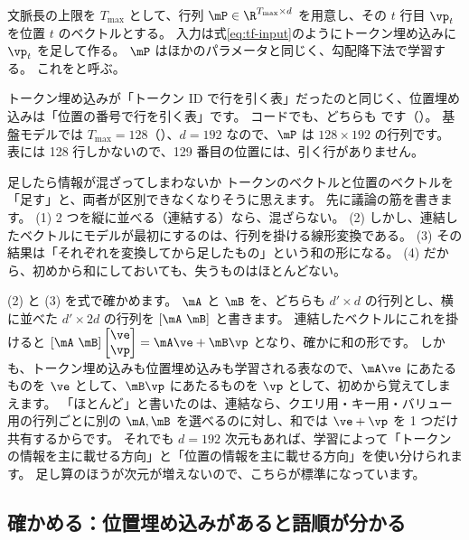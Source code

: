 \begin{definition}
文脈長の上限を $T_{\max}$ として、行列 $\mP\in\R^{T_{\max}\times d}$ を用意し、その $t$ 行目 $\vp_t$ を位置 $t$ のベクトルとする。
入力は式\eqref{eq:tf-input}のようにトークン埋め込みに $\vp_t$ を足して作る。
$\mP$ はほかのパラメータと同じく、勾配降下法で学習する。
これをと呼ぶ。
\end{definition}

トークン埋め込みが「トークン ID で行を引く表」だったのと同じく、位置埋め込みは「位置の番号で行を引く表」です。
コードでも、どちらも  です（）。
基盤モデルでは $T_{\max}=128$（）、$d=192$ なので、$\mP$ は $128\times 192$ の行列です。
表には 128 行しかないので、129 番目の位置には、引く行がありません。

\begin{caution}{足したら情報が混ざってしまわないか}
トークンのベクトルと位置のベクトルを「足す」と、両者が区別できなくなりそうに思えます。
先に議論の筋を書きます。
(1) 2 つを縦に並べる（連結する）なら、混ざらない。
(2) しかし、連結したベクトルにモデルが最初にするのは、行列を掛ける線形変換である。
(3) その結果は「それぞれを変換してから足したもの」という和の形になる。
(4) だから、初めから和にしておいても、失うものはほとんどない。

(2) と (3) を式で確かめます。
$\mA$ と $\mB$ を、どちらも $d'\times d$ の行列とし、横に並べた $d'\times 2d$ の行列を $[\mA\ \mB]$ と書きます。
連結したベクトルにこれを掛けると
$[\mA\ \mB]\begin{bmatrix}\ve\\ \vp\end{bmatrix}=\mA\ve+\mB\vp$
となり、確かに和の形です。
しかも、トークン埋め込みも位置埋め込みも学習される表なので、$\mA\ve$ にあたるものを $\ve$ として、$\mB\vp$ にあたるものを $\vp$ として、初めから覚えてしまえます。
「ほとんど」と書いたのは、連結なら、クエリ用・キー用・バリュー用の行列ごとに別の $\mA,\mB$ を選べるのに対し、和では $\ve+\vp$ を 1 つだけ共有するからです。
それでも $d=192$ 次元もあれば、学習によって「トークンの情報を主に載せる方向」と「位置の情報を主に載せる方向」を使い分けられます。
足し算のほうが次元が増えないので、こちらが標準になっています。
\end{caution}

\subsection*{確かめる：位置埋め込みがあると語順が分かる}

